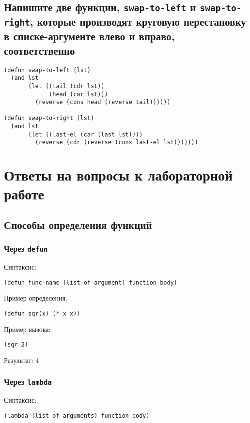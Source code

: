 \section{Напишите две функции, \texttt{swap-to-left} и \texttt{swap-to-right}, которые производят круговую перестановку в списке-аргументе влево и вправо, соответственно}

\begin{lstlisting}
(defun swap-to-left (lst)
  (and lst
       (let ((tail (cdr lst))
             (head (car lst)))
         (reverse (cons head (reverse tail))))))

(defun swap-to-right (lst)
  (and lst
       (let ((last-el (car (last lst))))
         (reverse (cdr (reverse (cons last-el lst)))))))
\end{lstlisting}

\chapter{Ответы на вопросы к лабораторной работе}

\section{Способы определения функций}

\subsection{Через \texttt{defun}}

Синтаксис:
\begin{lstlisting}
(defun func-name (list-of-argument) function-body)
\end{lstlisting}

Пример определения:
\begin{lstlisting}
(defun sqr(x) (* x x))
\end{lstlisting}

Пример вызова:
\begin{lstlisting}
(sqr 2)
\end{lstlisting}
Результат: 4

\subsection{Через \texttt{lambda}}

Синтаксис:
\begin{lstlisting}
(lambda (list-of-arguments) function-body)
\end{lstlisting}

